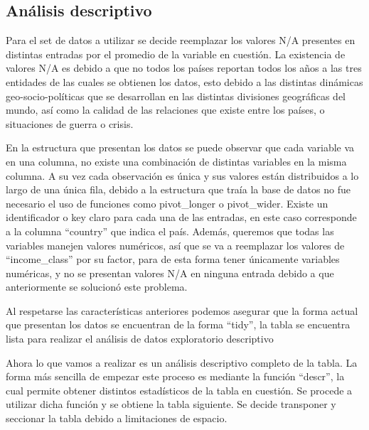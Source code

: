 \subsection{Análisis descriptivo}

Para el set de datos a utilizar se decide reemplazar los valores N/A presentes en distintas entradas por el promedio de la variable en cuestión. La existencia de valores N/A es debido a que no todos los países reportan todos los años a las tres entidades de las cuales se obtienen los datos, esto debido a las distintas dinámicas geo-socio-políticas que se desarrollan en las distintas divisiones geográficas del mundo, así como la calidad de las relaciones que existe entre los países, o situaciones de guerra o crisis.

En la estructura que presentan los datos se puede observar que cada variable va en una columna, no existe una combinación de distintas variables en la misma columna. A su vez cada observación es única y sus valores están distribuidos a lo largo de una única fila, debido a la estructura que traía la base de datos no fue necesario el uso de funciones como pivot\_longer o pivot\_wider. Existe un identificador o key claro para cada una de las entradas, en este caso corresponde a la columna ``country'' que indica el país. Además, queremos que todas las variables manejen valores numéricos, así que se va a reemplazar los valores de ``income\_class'' por su factor, para de esta forma tener únicamente variables numéricas, y no se presentan valores N/A en ninguna entrada debido a que anteriormente se solucionó este problema.

Al respetarse las características anteriores podemos asegurar que la forma actual que presentan los datos se encuentran de la forma ``tidy'', la tabla se encuentra lista para realizar el análisis de datos exploratorio descriptivo

Ahora lo que vamos a realizar es un análisis descriptivo completo de la tabla. La forma más sencilla de empezar este proceso es mediante la función ``descr'', la cual permite obtener distintos estadísticos de la tabla en cuestión. Se procede a utilizar dicha función y se obtiene la tabla siguiente. Se decide transponer y seccionar la tabla debido a limitaciones de espacio.




\newpage

